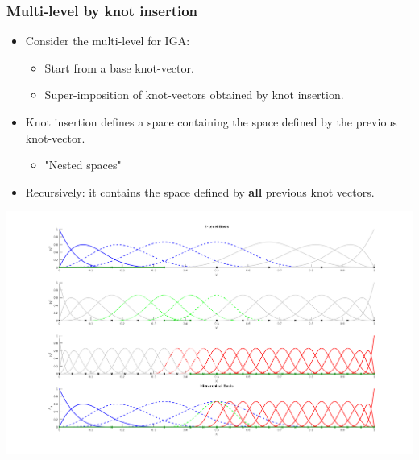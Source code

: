 \documentclass{beamer}
\begin{document}
\begin{frame}
\frametitle{Multi-level by knot insertion}

\begin{itemize}
	\item Consider the multi-level for IGA:
	\begin{itemize}
		\item Start from a base knot-vector.
		\item Super-imposition of knot-vectors obtained by knot insertion.
	\end{itemize}
	\item Knot insertion defines a space containing the space defined by the previous knot-vector.
	\begin{itemize}
		\item "Nested spaces"
	\end{itemize}
	\item Recursively: it contains the space defined by \textbf{all} previous knot vectors.
\end{itemize}
\centering
\includegraphics[scale=0.175]{operators1d/multiLevelBasis.png}
\end{frame}
\end{document}
